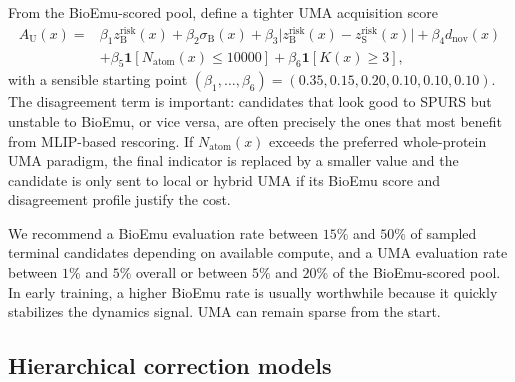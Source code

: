 \documentclass[11pt]{article}
\begin{document}
	From the BioEmu-scored pool, define a tighter UMA acquisition score
	\begin{equation}
		\label{eq:acquma}
		\begin{aligned}
			A_{\mathrm U}(x)={}&\beta_1 z_{\mathrm B}^{\mathrm{risk}}(x)+\beta_2 \sigma_{\mathrm B}(x)+\beta_3 \big|z_{\mathrm B}^{\mathrm{risk}}(x)-z_{\mathrm S}^{\mathrm{risk}}(x)\big|+\beta_4 d_{\mathrm{nov}}(x)\\
			&+\beta_5 \mathbf{1}[N_{\mathrm{atom}}(x)\leq 10000]+\beta_6 \mathbf{1}[K(x)\ge 3],
		\end{aligned}
	\end{equation}
	with a sensible starting point $(\beta_1,\ldots,\beta_6)=(0.35,0.15,0.20,0.10,0.10,0.10)$. The disagreement term is important: candidates that look good to SPURS but unstable to BioEmu, or vice versa, are often precisely the ones that most benefit from MLIP-based rescoring. If $N_{\mathrm{atom}}(x)$ exceeds the preferred whole-protein UMA paradigm, the final indicator is replaced by a smaller value and the candidate is only sent to local or hybrid UMA if its BioEmu score and disagreement profile justify the cost.
	
	We recommend a BioEmu evaluation rate between $15\%$ and $50\%$ of sampled terminal candidates depending on available compute, and a UMA evaluation rate between $1\%$ and $5\%$ overall or between $5\%$ and $20\%$ of the BioEmu-scored pool. In early training, a higher BioEmu rate is usually worthwhile because it quickly stabilizes the dynamics signal. UMA can remain sparse from the start.
	
	
	
	\subsection{Hierarchical correction models}
	
\end{document}
